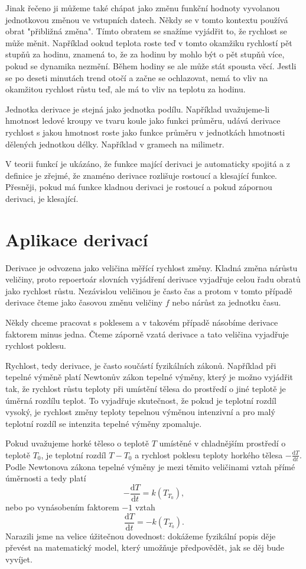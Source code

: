 \documentclass[12pt]{article}
\begin{document}
Jinak řečeno ji můžeme také chápat jako změnu funkční hodnoty vyvolanou jednotkovou změnou ve vstupních datech. Někdy se v tomto kontextu používá obrat "přibližná změna". Tímto obratem se snažíme vyjádřit to, že rychlost se může měnit. Například ookud teplota roste teď v tomto okamžiku rychlostí pět stupňů za hodinu, znamená to, že za hodinu by mohlo být o pět stupňů více, pokud se dynamika nezmění. Během hodiny se ale může stát spousta věcí. Jestli se po deseti minutách trend otočí a začne se ochlazovat, nemá to vliv na okamžitou rychlost růstu teď, ale má to vliv na teplotu za hodinu.

Jednotka derivace je stejná jako jednotka podílu. Například uvažujeme-li hmotnost ledové kroupy ve tvaru koule jako funkci průměru, udává derivace rychlost s jakou hmotnost roste jako funkce průměru v jednotkách hmotnosti dělených jednotkou délky. Například v gramech na milimetr.

V teorii funkcí je ukázáno, že funkce mající derivaci je automaticky spojitá a z definice je zřejmé, že znaméno derivace rozlišuje rostoucí a klesající funkce. Přesněji, pokud má funkce kladnou derivaci je rostoucí a pokud zápornou derivaci, je klesající.

\section*{Aplikace derivací}

Derivace je odvozena jako veličina měřící rychlost změny. Kladná změna nárůstu veličiny, proto repoertoár slovních vyjádření derivace vyjadřuje celou řadu obratů jako rychlost růstu. Nezávislou veličinou je často čas a protom v tomto případě derivace čteme jako časovou změnu veličiny $f$ nebo nárůst za jednotku času.

Někdy chceme pracovat s poklesem a v takovém případě násobíme derivace faktorem minus jedna. Čteme záporně vzatá derivace a tato veličina vyjadřuje rychlost poklesu.

Rychlost, tedy derivace, je často součástí fyzikálních zákonů. Například při tepelné výměně platí Newtonův zákon tepelné výměny, který je možno vyjádřit tak, že rychlost růstu teploty při umístění tělesa do prostředí o jiné teplotě je úměrná rozdílu teplot. To vyjadřuje skutečnost, že pokud je teplotní rozdíl vysoký, je rychlost změny teploty tepelnou výměnou intenzivní a pro malý teplotní rozdíl se intenzita tepelné výměny zpomaluje. 

Pokud uvažujeme horké těleso o teplotě $T$ umístěné v chladnějším prostředí o teplotě $T_0$, je teplotní rozdíl $T-T_0$ a rychlost poklesu teploty horkého tělesa $-\frac{\mathrm dT}{\mathrm dt}.$ Podle Newtonova zákona tepelné výměny je mezi těmito veličinami vztah přímé úměrnosti a tedy platí $$-\frac {\mathrm dT}{\mathrm dt}=k(T_T_0),$$
nebo po vynásobením faktorem $-1$ vztah
$$\frac {\mathrm dT}{\mathrm dt}=-k(T_T_0).$$ Narazili jsme na velice úžitečnou dovednost: dokážeme fyzikální popis děje převést na matematický model, který umožňuje předpovědět, jak se děj bude vyvíjet.
\end{document}
